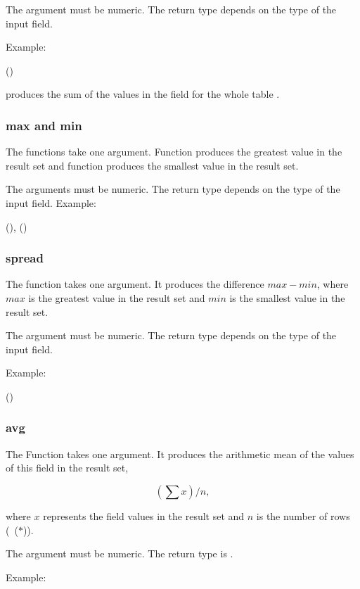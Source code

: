 The argument must be numeric.
The return type depends on the type of the input field.

Example:

 ()
   

produces the sum of the values in the  field
for the whole table .

\subsubsection{max and min}
The functions take one argument.
Function  produces the greatest value in the result set
and function  produces the smallest value in the result set.

The arguments must be numeric.
The return type depends on the type of the input field.
Example:

 (),
                 ()
 

\subsubsection{spread}
The function takes one argument.
It produces the difference $max - min$,
where $max$ is the greatest value in the result set
and $min$ is the smallest value in the result set.

The argument must be numeric.
The return type depends on the type of the input field.

Example:

 ()
 

\subsubsection{avg}
The Function takes one argument.
It produces the arithmetic mean of the values
of this field in the result set, \ie

\[
\left(\sum{x}\right)/n,
\]

where $x$ represents the
field values in the result set and $n$
is the number of rows (\ie\ ($\ast$)).

The argument must be numeric.
The return type is .

Example:

